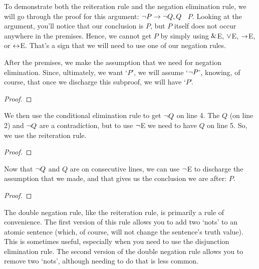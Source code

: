 
To demonstrate both the reiteration rule and the negation elimination rule, we will go through the proof for this argument: ${\neg} P \rightarrow {\neg} Q, Q$ \therefore\ $P$. Looking at the argument, you'll notice that our conclusion is $P$, but $P$ itself does not occur anywhere in the premises. Hence, we cannot get $P$ by simply using $\mathbin{\&}$E, $\vee$E, $\rightarrow$E, or $\leftrightarrow$E. That's a sign that we will need to use one of our negation rules.

After the premises, we make the assumption that we need for negation elimination. Since, ultimately, we want `$P$', we will assume `${\neg} P$', knowing, of course, that once we discharge this subproof, we will have `$P$'.

\begin{proof}
	 	
	 
	\open
\end{proof}
We then use the conditional elimination rule to get ${\neg} Q$ on line 4. The $Q$ (on line 2) and ${\neg} Q$ are a contradiction, but to use ${\neg}$E we need to have $Q$ on line 5. So, we use the reiteration rule. 

\begin{proof}
	 	
	 
	\open
\end{proof}
Now that ${\neg} Q$ and $Q$ are on consecutive lines, we can use ${\neg}$E to discharge the assumption that we made, and that gives us the conclusion we are after: $P$.

\begin{proof}
	 	
	 
	\open
	\close
\end{proof}

The double negation rule, like the reiteration rule, is primarily a rule of convenience. The first version of this rule allows you to add two `nots' to an atomic sentence (which, of course, will not change the sentence's truth value). This is sometimes useful, especially when you need to use the disjunction elimination rule. The second version of the double negation rule allows you to remove two `nots', although needing to do that is less common.

